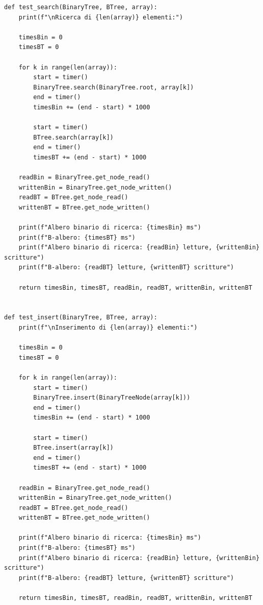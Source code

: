 \begin{verbatim}
def test_search(BinaryTree, BTree, array):
    print(f"\nRicerca di {len(array)} elementi:")

    timesBin = 0
    timesBT = 0

    for k in range(len(array)):
        start = timer()
        BinaryTree.search(BinaryTree.root, array[k])
        end = timer()
        timesBin += (end - start) * 1000

        start = timer()
        BTree.search(array[k])
        end = timer()
        timesBT += (end - start) * 1000

    readBin = BinaryTree.get_node_read()
    writtenBin = BinaryTree.get_node_written()
    readBT = BTree.get_node_read()
    writtenBT = BTree.get_node_written()

    print(f"Albero binario di ricerca: {timesBin} ms")
    print(f"B-albero: {timesBT} ms")
    print(f"Albero binario di ricerca: {readBin} letture, {writtenBin} scritture")
    print(f"B-albero: {readBT} letture, {writtenBT} scritture")

    return timesBin, timesBT, readBin, readBT, writtenBin, writtenBT


def test_insert(BinaryTree, BTree, array):
    print(f"\nInserimento di {len(array)} elementi:")

    timesBin = 0
    timesBT = 0

    for k in range(len(array)):
        start = timer()
        BinaryTree.insert(BinaryTreeNode(array[k]))
        end = timer()
        timesBin += (end - start) * 1000

        start = timer()
        BTree.insert(array[k])
        end = timer()
        timesBT += (end - start) * 1000

    readBin = BinaryTree.get_node_read()
    writtenBin = BinaryTree.get_node_written()
    readBT = BTree.get_node_read()
    writtenBT = BTree.get_node_written()

    print(f"Albero binario di ricerca: {timesBin} ms")
    print(f"B-albero: {timesBT} ms")
    print(f"Albero binario di ricerca: {readBin} letture, {writtenBin} scritture")
    print(f"B-albero: {readBT} letture, {writtenBT} scritture")

    return timesBin, timesBT, readBin, readBT, writtenBin, writtenBT
\end{verbatim}

